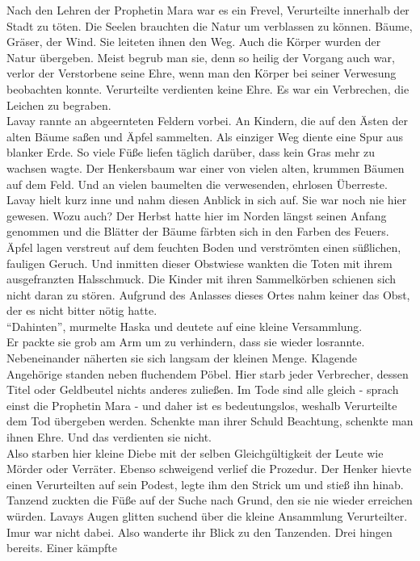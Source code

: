 Nach den Lehren der Prophetin Mara war es ein Frevel, Verurteilte innerhalb der Stadt zu töten. Die 
Seelen brauchten die Natur um verblassen zu können. Bäume, Gräser, der Wind. Sie leiteten ihnen den 
Weg. Auch die Körper wurden der Natur übergeben. Meist begrub man sie, denn so heilig der Vorgang 
auch war, verlor der Verstorbene seine Ehre, wenn man den Körper bei seiner Verwesung beobachten 
konnte. Verurteilte verdienten keine Ehre. Es war ein Verbrechen, die Leichen zu begraben.\\
Lavay rannte an abgeernteten Feldern vorbei. An Kindern, die auf den Ästen der alten Bäume saßen 
und Äpfel sammelten. Als einziger Weg diente eine Spur aus blanker Erde. So viele Füße liefen 
täglich darüber, dass kein Gras mehr zu wachsen wagte. Der Henkersbaum war einer von vielen alten, 
krummen Bäumen auf dem Feld. Und an vielen baumelten die verwesenden, ehrlosen Überreste. Lavay 
hielt kurz inne und nahm diesen Anblick in sich auf. Sie war noch nie hier gewesen. Wozu auch? 
Der Herbst hatte hier im Norden längst seinen Anfang genommen und die Blätter der Bäume färbten 
sich in den Farben des Feuers. Äpfel lagen verstreut auf dem feuchten Boden und verströmten einen 
süßlichen, fauligen Geruch. Und inmitten dieser Obstwiese wankten die Toten mit ihrem ausgefranzten 
Halsschmuck. Die Kinder mit ihren Sammelkörben schienen sich nicht daran zu stören. Aufgrund des 
Anlasses dieses Ortes nahm keiner das Obst, der es nicht bitter nötig hatte. \\
``Dahinten'', murmelte Haska und deutete auf eine kleine Versammlung. \\
Er packte sie grob am Arm um zu verhindern, dass sie wieder losrannte. Nebeneinander näherten sie 
sich langsam der kleinen Menge. Klagende Angehörige standen neben fluchendem Pöbel. Hier starb 
jeder Verbrecher, dessen Titel oder Geldbeutel nichts anderes zuließen. Im Tode sind alle gleich - 
sprach einst die Prophetin Mara - und daher ist es bedeutungslos, weshalb Verurteilte dem Tod 
übergeben werden. Schenkte man ihrer Schuld Beachtung, schenkte man ihnen Ehre. Und das verdienten 
sie nicht. \\
Also starben hier kleine Diebe mit der selben Gleichgültigkeit der Leute wie Mörder oder Verräter. 
Ebenso schweigend verlief die Prozedur. Der Henker hievte einen Verurteilten auf sein Podest, legte 
ihm den Strick um und stieß ihn hinab. Tanzend zuckten die Füße auf der Suche nach Grund, den sie 
nie wieder erreichen würden. Lavays Augen glitten suchend über die kleine Ansammlung Verurteilter. 
Imur war nicht dabei. Also wanderte ihr Blick zu den Tanzenden. Drei hingen bereits. Einer kämpfte 
